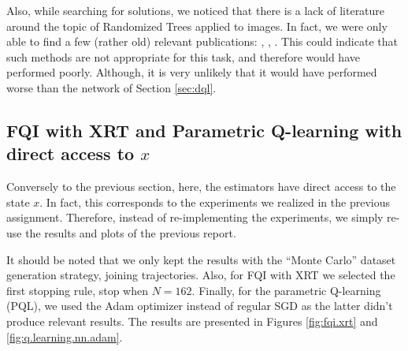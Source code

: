 \documentclass[a4paper, 12pt]{article}
\begin{document}
    Also, while searching for solutions, we noticed that there is a lack of literature around the topic of Randomized Trees applied to images. In fact, we were only able to find a few (rather old) relevant publications: \textcite{ernst2006reinforcement}, \textcite{bosch2007image}, \textcite{maree2007random}. This could indicate that such methods are not appropriate for this task, and therefore would have performed poorly. Although, it is very unlikely that it would have performed worse than the network of Section \ref{sec:dql}.
    
    \subsection{FQI with XRT and Parametric Q-learning with direct access to $x$}
    
    Conversely to the previous section, here, the estimators have direct access to the state $x$. In fact, this corresponds to the experiments we realized in the previous assignment. Therefore, instead of re-implementing the experiments, we simply re-use the results and plots of the previous report.
    
    It should be noted that we only kept the results with the \enquote{Monte Carlo} dataset generation strategy, \ie{} joining trajectories. Also, for FQI with XRT we selected the first stopping rule, \ie{} stop when $N=162$. Finally, for the parametric Q-learning (PQL), we used the Adam optimizer instead of regular SGD as the latter didn't produce relevant results. The results are presented in Figures \ref{fig:fqi.xrt} and \ref{fig:q.learning.nn.adam}.
    
\end{document}
